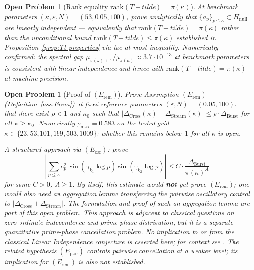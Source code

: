 \documentclass[11pt]{article}
\def\Tt{T-tilde}%
\newtheorem{openproblem}[theorem]{Open Problem}
\newcommand{\Hnull}{H_{\mathrm{null}}}
\newcommand{\Tt}{\widetilde{T}}
\newcommand{\Dburstvar}{\Delta_{\mathrm{Burst}}}
\newcommand{\Dcross}{\Delta_{\mathrm{Cross}}}
\newcommand{\Dstream}{\Delta_{\mathrm{Stream}}}
\begin{document}
\begin{openproblem}[Rank equality $\mathrm{rank}(\Tt)=\pi(\kappa)$]\label{op:rank-eq}
At benchmark parameters $(\kappa,\varepsilon,N)=(53,0.05,100)$, prove
analytically that $\{a_p\}_{p\leq\kappa}\subset\Hnull$ are linearly
independent --- equivalently that $\mathrm{rank}(\Tt)=\pi(\kappa)$
rather than the unconditional bound $\mathrm{rank}(\Tt)\leq\pi(\kappa)$
established in Proposition~\ref{prop:Tt-properties} via the at-most
inequality. Numerically confirmed: the spectral gap
$\mu_{\pi(\kappa)+1}/\mu_{\pi(\kappa)}\approx 3.7\cdot 10^{-13}$ at
benchmark parameters is consistent with linear independence and hence
with $\mathrm{rank}(\Tt)=\pi(\kappa)$ at machine precision.
\end{openproblem}

\begin{openproblem}[Proof of $(E_{\mathrm{rem}})$]\label{op:weyl}
Prove Assumption $(E_{\mathrm{rem}})$ (Definition~\ref{ass:Erem})
at fixed reference parameters $(\varepsilon,N)=(0.05,100)$:
that there exist $\rho<1$ and $\kappa_0$ such that
$|\Dcross(\kappa)+\Dstream(\kappa)|\le\rho\cdot\Dburstvar$
for all $\kappa\ge\kappa_0$.
Numerically $\rho_{\max}=0.583$ on the tested grid
$\kappa\in\{23,53,101,199,503,1009\}$; whether this remains below~$1$
for all $\kappa$ is open.

A structured approach via $(E_{\mathrm{osc}})$: prove
\[
\left|\sum_{p\le\kappa} c_p^2\,
      \sin(\gamma_{k_1}\log p)\sin(\gamma_{k_2}\log p)
\right| \le C\cdot\frac{\Dburstvar}{\pi(\kappa)^A}
\]
for some $C>0$, $A\ge 1$.
By itself, this estimate would \textbf{not} yet prove $(E_{\mathrm{rem}})$;
one would also need an aggregation lemma transferring the pairwise
oscillatory control to $|\Dcross+\Dstream|$.
The formulation and proof of such an aggregation lemma
are part of this open problem.
This approach is adjacent to classical questions on zero-ordinate
independence and prime phase distribution, but it is a separate
quantitative prime-phase cancellation problem.
No implication to or from the classical Linear Independence
conjecture is asserted here; for context see
\cite{Ingham42,RubinsteinSarnak94,FordMengZaharescu17}.
The related hypothesis $(E_{\mathrm{pair}})$ controls pairwise
cancellation at a weaker level; its implication for $(E_{\mathrm{rem}})$
is also not established.
\end{openproblem}
\end{document}
